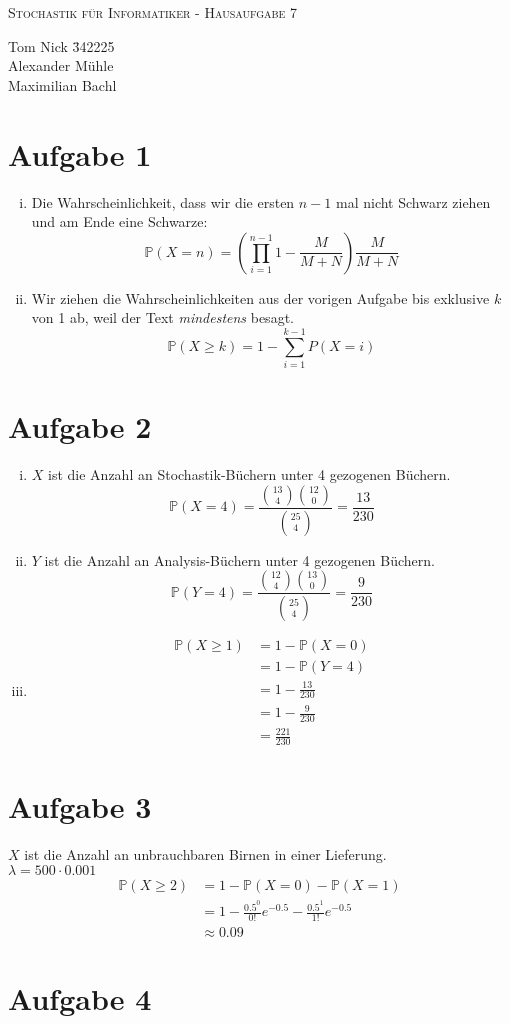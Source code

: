\documentclass[10pt,a4paper,parskip=half]{scrartcl}
\begin{document}
\begin{center}
\textsc{\Large{Stochastik für Informatiker - Hausaufgabe 7}} \\
\end{center}
\begin{tabbing}
Tom Nick \hspace{1.4cm}\= 342225\\
Alexander Mühle\\
Maximilian Bachl
\end{tabbing}
\section*{Aufgabe 1}
\begin{enumerate}[(i)]
\item
Die Wahrscheinlichkeit, dass wir die ersten $n-1$ mal nicht Schwarz ziehen und am Ende eine Schwarze:
$$\mathbb P(X = n) = \left(\prod_{i=1}^{n-1} 1-\frac{M}{M+N}\right) \frac{M}{M+N}$$
\item
Wir ziehen die Wahrscheinlichkeiten aus der vorigen Aufgabe bis exklusive $k$ von 1 ab, weil der Text \textit{mindestens} besagt.
$$ \mathbb P(X \ge k) = 1 - \sum_{i=1}^{k-1} P(X = i)$$
\end{enumerate}
\section*{Aufgabe 2}
\begin{enumerate}[(i)]
\item
$X$ ist die Anzahl an Stochastik-Büchern unter 4 gezogenen Büchern.
$$\mathbb P(X=4) = \frac{{13\choose 4} {12 \choose 0}}{{25 \choose 4}} = \frac{13}{230}$$
\item
$Y$ ist die Anzahl an Analysis-Büchern unter 4 gezogenen Büchern.
$$\mathbb P(Y=4) = \frac{{12\choose 4} {13 \choose 0}}{{25 \choose 4}} = \frac{9}{230}$$
\item
\begin{align*}
\mathbb P(X\ge 1) &= 1 - \mathbb P(X= 0)\\
&= 1 - \mathbb P(Y= 4)\\
&= 1 - \frac{13}{230}\\
&= 1 - \frac 9 {230}\\
&= \frac{221}{230}
\end{align*}
\end{enumerate}
\section*{Aufgabe 3}
$X$ ist die Anzahl an unbrauchbaren Birnen in einer Lieferung.\\
$\lambda = 500 \cdot 0.001$
\begin{align*}
\mathbb P(X \ge 2) &= 1 - \mathbb P(X = 0) - \mathbb P(X = 1)\\
&= 1 - \frac{0.5^0}{0!}e^{-0.5} - \frac{0.5^1}{1!}e^{-0.5}\\
& \approx 0.09
\end{align*}
\section*{Aufgabe 4}
\end{document}
